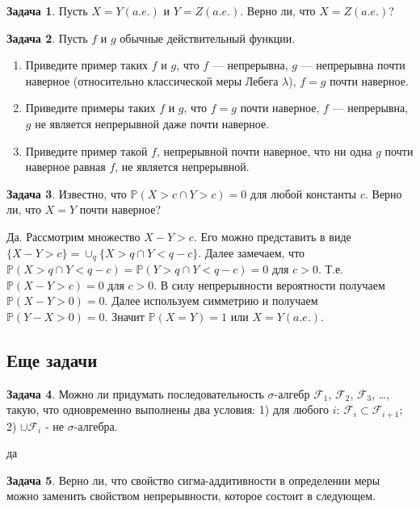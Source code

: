 \documentclass[pdftex, 12pt, a4paper]{article}
\def \mbb{\mathbb}
\def \PP{\mbb{P}}
\theoremstyle{definition} %
\newtheorem{problem}{Задача}
\numberwithin{problem}{section}
\numberwithin{blits}{section}
\begin{document}
\begin{problem}
Пусть $X=Y (a.e.)$ и $Y = Z (a.e.)$. Верно ли, что $X = Z (a.e.)$?
\begin{sol}

\end{sol}
\end{problem}

\begin{problem}
Пусть $f$ и $g$ обычные действительный функции.
\begin{enumerate}
\item Приведите пример таких $f$ и $g$, что $f$ --- непрерывна, $g$ --- непрерывна почти наверное (относительно классической меры Лебега $\lambda$), $f=g$ почти наверное.
\item Приведите примеры таких $f$ и $g$, что $f=g$ почти наверное, $f$ --- непрерывна, $g$ не является непрерывной даже почти наверное.
\item Приведите пример такой $f$, непрерывной почти наверное, что ни одна $g$ почти наверное равная $f$, не является непрерывной.
\end{enumerate}
\begin{sol}

\end{sol}
\end{problem}

\begin{problem}
Известно, что $\PP(X > c \cap Y >c) = 0$ для любой константы $c$. Верно ли, что $X=Y$ почти наверное?
\begin{sol}
Да. Рассмотрим множество $X-Y >c$. Его можно представить в виде $\{X-Y >c \} = \cup_{q} \{X > q \cap Y < q-c \}$. Далее замечаем, что $\PP(X>q \cap Y <q-c) = \PP(Y > q \cap Y < q-c) = 0$ для $c >0$. Т.е. $\PP(X-Y > c) = 0$ для $c > 0$. В силу непрерывности вероятности получаем $\PP(X-Y > 0) = 0$. Далее используем симметрию и получаем $\PP(Y-X >0) = 0.$ Значит $\PP(X=Y) = 1$ или $X = Y (a.e.)$.
\end{sol}
\end{problem}




\subsection{Еще задачи}


\begin{problem}
Можно ли придумать последовательность $\sigma$-алгебр $\mathcal{F}_{1}$, $\mathcal{F}_{2}$, $\mathcal{F}_{3}$, \ldots , такую, что одновременно выполнены два условия: 1) для любого $i$: $\mathcal{F}_{i}\subset \mathcal{F}_{i+1}$; 2) $\cup \mathcal{F}_{i}$ - не $\sigma$-алгебра.
\begin{sol}
да
\end{sol}
\end{problem}







\begin{problem}
Верно ли, что свойство сигма-аддитивности в определении меры можно заменить свойством непрерывности, которое состоит в следующем. 

\end{problem}





\printbibliography
\end{document}
